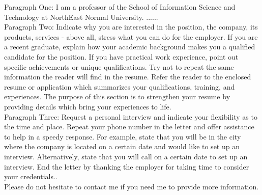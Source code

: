Paragraph One: I am a professor of the School of Information Science and Technology at NorthEast Normal University.  ......\\

Paragraph Two: Indicate why you are interested in the position, the company, its products, services - above all, stress 
what you can do for the employer. If you are a recent graduate, explain how your academic background makes you a qualified 
candidate for the position. If you have practical work experience, point out specific achievements or unique qualifications. 
Try not to repeat the same information the reader will find in the resume. Refer the reader to the enclosed resume or application 
which summarizes your qualifications, training, and experiences. The purpose of this section is to strengthen your resume by 
providing details which bring your experiences to life. \\
 
Paragraph Three: Request a personal interview and indicate your flexibility as to the time and place. Repeat your phone number 
in the letter and offer assistance to help in a speedy response. For example, state that you will be in the city where the company 
is located on a certain date and would like to set up an interview. Alternatively, state that you will call on a certain date to set 
up an interview. End the letter by thanking the employer for taking time to consider your credentials.. \\

Please do not hesitate to contact me if you need me to provide more information.
